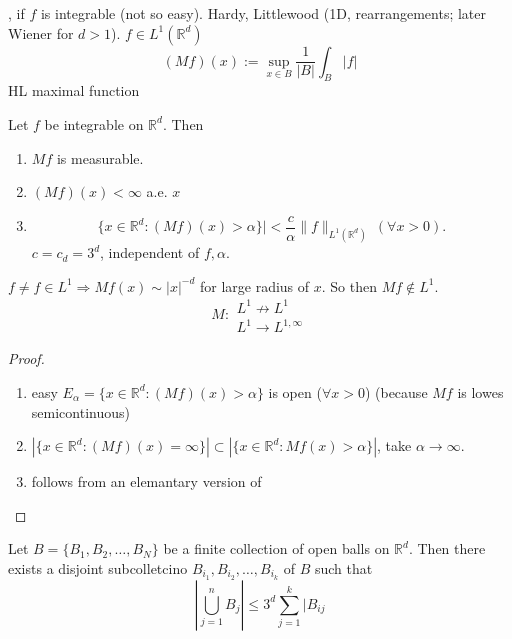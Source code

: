 , if $f$ is integrable (not so easy). Hardy, Littlewood (1D, rearrangements; later Wiener for $d>1$). $f∈L^1(ℝ^d)$
\begin{equation*}
	(Mf)(x):=\sup_{x∈B}\frac1{|B|}∫_B|f|
\end{equation*}
 HL maximal function
\begin{theo}
	Let $f$ be integrable on $ℝ^d$. Then
	\begin{enumerate}
		\item $Mf$ is measurable.
		\item $(Mf)(x)<∞$ a.e. $x$
		\item 
			\begin{equation} 
				\{x∈ℝ^d:(Mf)(x)>α\}|<\frac cα\|f\|_{L^1(ℝ^d)}\ (∀x>0)\label{eq:maxweak}.
			\end{equation} $c=c_d=3^d$, independent of $f,α$.
	\end{enumerate}
\end{theo}
$f\neq f∈L^1 ⇒Mf(x)\sim|x|^{-d}$ for large radius of $x$. So then $Mf\not\in L^1$.
\begin{equation*}
	M:
	\begin{matrix}
		L^1\not\to L^1\\
		L^1→L^{1,∞}
	\end{matrix}
\end{equation*}
\begin{proof}
	\begin{enumerate}
		\item easy $E_α=\{x∈ℝ^d:(Mf)(x)>α\}$ is open ($∀x>0$) (because $Mf$ is lowes semicontinuous)
		\item $|\{x∈ℝ^d: (Mf)(x)=∞\}|⊂|\{x∈ℝ^d:Mf(x)>α\}|$, take $α→∞$.
		\item follows from an elemantary version of 
	\end{enumerate}
\end{proof}%
\begin{lem}
	Let $B=\{B_1,B_2,\ldots, B_N\}$ be a finite collection of open balls on $ℝ^d$. Then there exists a disjoint subcolletcino $B_{i_1},B_{i_2},\ldots,B_{i_k}$ of $B$ such that
	\begin{equation*}
		|\bigcup_{j=1}^nB_j|\leq3^d\sum_{j=1}^k|B_{ij}
	\end{equation*}
\end{lem}
